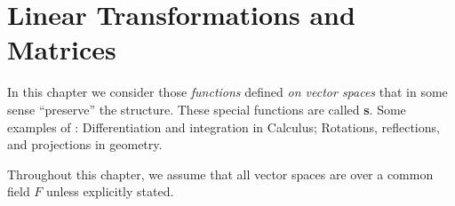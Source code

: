 \chapter{Linear Transformations and Matrices} \label{ch 2}

\begin{note}
In this chapter we consider those \emph{functions} defined \emph{on vector spaces} that in some sense ``preserve'' the structure.
These special functions are called \textbf{\LTRAN{}s}.
Some examples of \LTRAN{}:
Differentiation and integration in Calculus;
Rotations, reflections, and projections in geometry.
\end{note}

\begin{remark} \label{remark 2.0.1}
Throughout this chapter, we assume that all vector spaces are over a common field \(F\) unless explicitly stated.
\end{remark}








